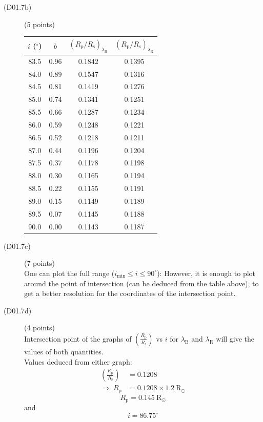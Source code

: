 \begin{description}
\item[(D01.7b)] \hfill(5 points)
\begin{center}
\begin{tabular}{cccc}
\toprule
$i$ ($^\circ$) & $b$ & $(R_{\mathrm{p}}/R_{\mathrm{s}})_{\lambda_{\mathrm{B}}}$
  & $(R_{\mathrm{p}}/R_{\mathrm{s}})_{\lambda_{\mathrm{R}}}$\\
\midrule
83.5 & 0.96 & 0.1842 & 0.1395\\
84.0 & 0.89 & 0.1547 & 0.1316\\
84.5 & 0.81 & 0.1419 & 0.1276\\
85.0 & 0.74 & 0.1341 & 0.1251\\
85.5 & 0.66 & 0.1287 & 0.1234\\
86.0 & 0.59 & 0.1248 & 0.1221\\
86.5 & 0.52 & 0.1218 & 0.1211\\
87.0 & 0.44 & 0.1196 & 0.1204\\
87.5 & 0.37 & 0.1178 & 0.1198\\
88.0 & 0.30 & 0.1165 & 0.1194\\
88.5 & 0.22 & 0.1155 & 0.1191\\
89.0 & 0.15 & 0.1149 & 0.1189\\
89.5 & 0.07 & 0.1145 & 0.1188\\
90.0 & 0.00 & 0.1143 & 0.1187\\
\bottomrule
\end{tabular}
\end{center}

\item[(D01.7c)] \hfill(7 points)\\
One can plot the full range ($i_{\min}\le i\le 90^\circ$):
However, it is enough to plot around the point of intersection (can be
deduced from the table above), to get a better resolution for the coordinates
of the intersection point.

\item[(D01.7d)] \hfill(4 points)\\
Intersection point of the graphs of
$\left(\frac{R_{\mathrm{p}}}{R_{\mathrm{s}}}\right)$ vs $i$ for
$\lambda_{\mathrm{B}}$ and $\lambda_{\mathrm{R}}$ will give the values of both
quantities.\\
Values deduced from either graph:
\begin{align*}
\left(\frac{R_{\mathrm{p}}}{R_{\mathrm{s}}}\right) &= 0.1208\\
\Longrightarrow\ R_{\mathrm{p}} &= 0.1208\times1.2\ \mathrm{R_\odot}
\end{align*}
\[ \boxed{R_{\mathrm{p}} = 0.145\ \mathrm{R_\odot}} \]
and
\[ \boxed{i = 86.75^\circ} \]


\end{description}
